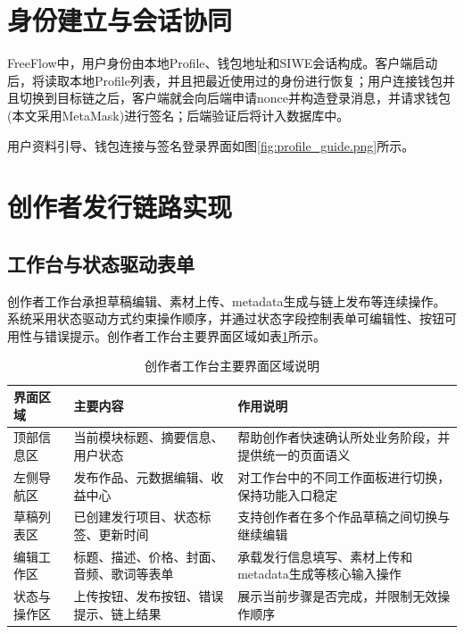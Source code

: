 \section{身份建立与会话协同}

FreeFlow中，用户身份由本地Profile、钱包地址和SIWE会话构成。客户端启动后，将读取本地Profile列表，并且把最近使用过的身份进行恢复；用户连接钱包并且切换到目标链之后，客户端就会向后端申请nonce并构造登录消息，并请求钱包(本文采用MetaMask)进行签名；后端验证后将计入数据库中。


用户资料引导、钱包连接与签名登录界面如图\ref{fig:profile_guide.png}所示。


\section{创作者发行链路实现}

\subsection{工作台与状态驱动表单}

创作者工作台承担草稿编辑、素材上传、metadata生成与链上发布等连续操作。系统采用状态驱动方式约束操作顺序，并通过状态字段控制表单可编辑性、按钮可用性与错误提示。创作者工作台主要界面区域如表\ref{tab:creator_workshop_regions}所示。

\begin{table}[htbp]
    \linespread{1.45}
    \songti
    \centering
    \caption{创作者工作台主要界面区域说明}\label{tab:creator_workshop_regions}
    \begin{tabular}{|l|p{4.0cm}|p{6.1cm}|}
        \hline
        界面区域   & 主要内容                 & 作用说明                            \\ \hline
        顶部信息区  & 当前模块标题、摘要信息、用户状态     & 帮助创作者快速确认所处业务阶段，并提供统一的页面语义      \\ \hline
        左侧导航区  & 发布作品、元数据编辑、收益中心      & 对工作台中的不同工作面板进行切换，保持功能入口稳定       \\ \hline
        草稿列表区  & 已创建发行项目、状态标签、更新时间    & 支持创作者在多个作品草稿之间切换与继续编辑           \\ \hline
        编辑工作区  & 标题、描述、价格、封面、音频、歌词等表单 & 承载发行信息填写、素材上传和metadata生成等核心输入操作 \\ \hline
        状态与操作区 & 上传按钮、发布按钮、错误提示、链上结果  & 展示当前步骤是否完成，并限制无效操作顺序            \\ \hline
    \end{tabular}
\end{table}

